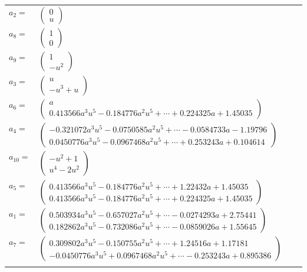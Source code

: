 \documentclass[1p]{elsarticle_modified}
\theoremstyle{definition}
\begin{document}
\begin{tabular}{m{7pt} m{180pt} m{7pt} m{180pt} }
\flushright $a_{2}=$&$\begin{pmatrix}0\\u\end{pmatrix}$ \\
\flushright $a_{8}=$&$\begin{pmatrix}1\\0\end{pmatrix}$ \\
\flushright $a_{9}=$&$\begin{pmatrix}1\\- u^2\end{pmatrix}$ \\
\flushright $a_{3}=$&$\begin{pmatrix}u\\- u^3+u\end{pmatrix}$ \\
\flushright $a_{6}=$&$\begin{pmatrix}a\\0.413566 a^{3} u^{5}-0.184776 a^{2} u^{5}+\cdots+0.224325 a+1.45035\end{pmatrix}$ \\
\flushright $a_{4}=$&$\begin{pmatrix}-0.321072 a^{3} u^{5}-0.0750585 a^{2} u^{5}+\cdots-0.0584733 a-1.19796\\0.0450776 a^{3} u^{5}-0.0967468 a^{2} u^{5}+\cdots+0.253243 a+0.104614\end{pmatrix}$ \\
\flushright $a_{10}=$&$\begin{pmatrix}- u^2+1\\u^4-2 u^2\end{pmatrix}$ \\
\flushright $a_{5}=$&$\begin{pmatrix}0.413566 a^{3} u^{5}-0.184776 a^{2} u^{5}+\cdots+1.22432 a+1.45035\\0.413566 a^{3} u^{5}-0.184776 a^{2} u^{5}+\cdots+0.224325 a+1.45035\end{pmatrix}$ \\
\flushright $a_{1}=$&$\begin{pmatrix}0.503934 a^{3} u^{5}-0.657027 a^{2} u^{5}+\cdots-0.0274293 a+2.75441\\0.182862 a^{3} u^{5}-0.732086 a^{2} u^{5}+\cdots-0.0859026 a+1.55645\end{pmatrix}$ \\
\flushright $a_{7}=$&$\begin{pmatrix}0.309802 a^{3} u^{5}-0.150755 a^{2} u^{5}+\cdots+1.24516 a+1.17181\\-0.0450776 a^{3} u^{5}+0.0967468 a^{2} u^{5}+\cdots-0.253243 a+0.895386\end{pmatrix}$\\&\end{tabular}
\end{document}
